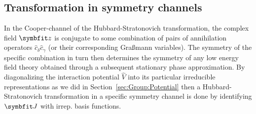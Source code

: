 \subsection{Transformation in symmetry channels}

In the Cooper-channel of the Hubbard-Stratonovich transformation, the complex field $\v{z}$ is conjugate to some combination
of pairs of annihilation operators $\hat{c}_\delta \hat{c}_\gamma$ (or their corresponding Gra\ss mann variables).
The symmetry of the specific combination in turn then determines the symmetry of any low energy field theory obtained
through a subsequent stationary phase approximation. By diagonalizing the interaction potential $\hat{V}$ into its particular
irreducible representations as we did in Section~\ref{sec:Group:Potential} then a Hubbard-Stratonovich transformation
in a specific symmetry channel is done by identifying $\v{J}$ with irrep. basis functions. 

